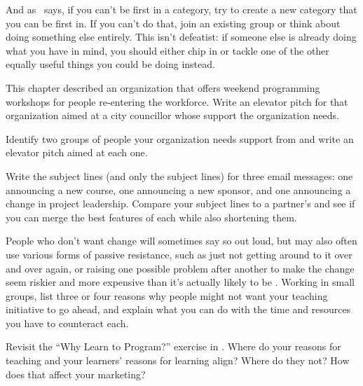 And as~\cite{Kuch2011} says,
if you can't be first in a category,
try to create a new category that you can be first in.
If you can't do that,
join an existing group or think about doing something else entirely.
This isn't defeatist:
if someone else is already doing what you have in mind,
you should either chip in or tackle one of the other equally useful things
you could be doing instead.



This chapter described an organization
that offers weekend programming workshops for people re-entering the workforce.
Write an elevator pitch for that organization
aimed at a city councillor whose support the organization needs.


Identify two groups of people your organization needs support from
and write an elevator pitch aimed at each one.


Write the subject lines (and only the subject lines) for three email messages:
one announcing a new course,
one announcing a new sponsor,
and one announcing a change in project leadership.
Compare your subject lines to a partner's
and see if you can merge the best features of each while also shortening them.


People who don't want change will sometimes say so out loud,
but may also often use various forms of passive resistance,
such as just not getting around to it over and over again,
or raising one possible problem after another
to make the change seem riskier and more expensive than it's actually likely to be
\cite{Scot1987}.
Working in small groups,
list three or four reasons why people might not want your teaching initiative to go ahead,
and explain what you can do with the time and resources you have to counteract each.


Revisit the ``Why Learn to Program?'' exercise in .
Where do your reasons for teaching and your learners' reasons for learning align?
Where do they not?
How does that affect your marketing?


